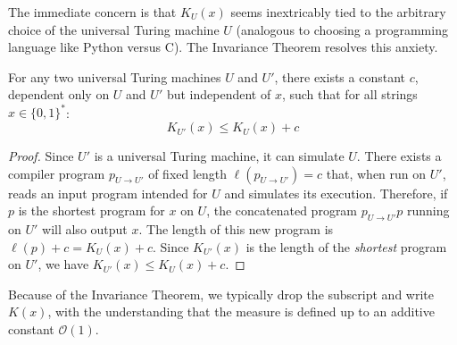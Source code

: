 The immediate concern is that $K_U(x)$ seems inextricably tied to the arbitrary choice of the universal Turing machine $U$ (analogous to choosing a programming language like Python versus C). The Invariance Theorem resolves this anxiety.

\begin{theorem}
For any two universal Turing machines $U$ and $U'$, there exists a constant $c$, dependent only on $U$ and $U'$ but independent of $x$, such that for all strings $x \in \{0, 1\}^*$:
\[ K_{U'}(x) \le K_U(x) + c \]
\end{theorem}

\begin{proof}
Since $U'$ is a universal Turing machine, it can simulate $U$. There exists a compiler program $p_{U \to U'}$ of fixed length $\ell(p_{U \to U'}) = c$ that, when run on $U'$, reads an input program intended for $U$ and simulates its execution. Therefore, if $p$ is the shortest program for $x$ on $U$, the concatenated program $p_{U \to U'}p$ running on $U'$ will also output $x$. The length of this new program is $\ell(p) + c = K_U(x) + c$. Since $K_{U'}(x)$ is the length of the \textit{shortest} program on $U'$, we have $K_{U'}(x) \le K_U(x) + c$.
\end{proof}

Because of the Invariance Theorem, we typically drop the subscript and write $K(x)$, with the understanding that the measure is defined up to an additive constant $\mathcal{O}(1)$.

